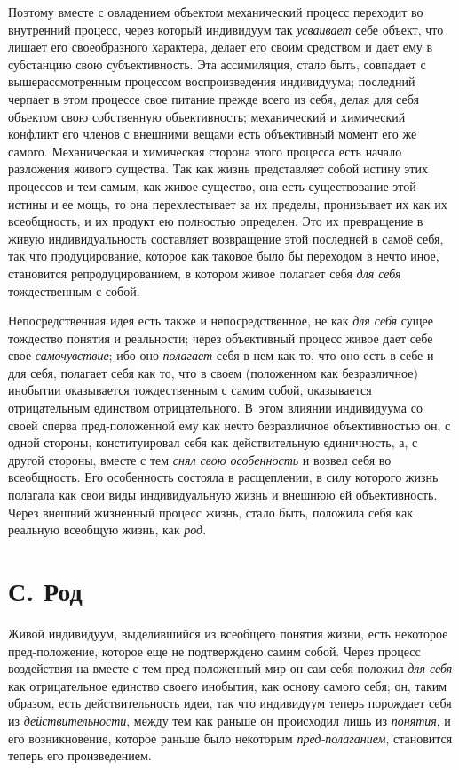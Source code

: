 Поэтому вместе с овладением объектом механический процесс
переходит во внутренний процесс, через который индивидуум так
{\em усваивает} себе
объект, что лишает его своеобразного характера, делает его своим средством
и дает ему в субстанцию свою субъективность. Эта ассимиляция, стало быть,
совпадает с вышерассмотренным процессом воспроизведения индивидуума;
последний черпает в этом процессе свое питание прежде всего из себя,
делая для себя объектом свою собственную объективность;
механический и химический конфликт его членов с внешними вещами есть
объективный момент его же самого. Механическая и химическая сторона этого
процесса есть начало разложения живого существа. Так как жизнь представляет
собой истину этих процессов и тем самым, как живое существо, она есть
существование этой истины и ее мощь, то она перехлестывает за их пределы,
пронизывает их как их всеобщность, и их продукт ею полностью определен. Это
их превращение в живую индивидуальность составляет возвращение этой
последней в самоё себя, так что продуцирование, которое как таковое было бы
переходом в нечто иное, становится репродуцированием, в котором живое
полагает себя {\em для себя}
тождественным с собой.

Непосредственная идея есть также и непосредственное, не как
{\em для себя} сущее
тождество понятия и реальности; через объективный процесс живое дает себе
свое {\em самочувствие};
ибо оно {\em полагает}
себя в нем как то, что оно есть в себе и для себя, полагает
себя как то, что в своем (положенном как безразличное) инобытии оказывается
тождественным с самим собой, оказывается отрицательным единством
отрицательного. В~этом влиянии индивидуума со своей сперва пред-положенной
ему как нечто безразличное объективностью он, с одной стороны,
конституировал себя как действительную единичность, а, с другой стороны,
вместе с тем {\em снял свою
особенность} и возвел себя во всеобщность. Его особенность
состояла в расщеплении, в силу которого жизнь полагала как свои виды
индивидуальную жизнь и внешнюю ей объективность. Через внешний жизненный
процесс жизнь, стало быть, положила себя как реальную всеобщую жизнь, как
{\em род}.

\section[С. Род]{С. Род}
Живой индивидуум, выделившийся из всеобщего понятия жизни,
есть некоторое пред-положение, которое еще не подтверждено самим собой.
Через процесс воздействия на вместе с тем пред-положенный мир он сам себя
положил {\em для себя}
как отрицательное единство своего инобытия, как основу самого
себя; он, таким образом, есть действительность идеи, так что индивидуум
теперь порождает себя из
{\em действительности},
между тем как раньше он происходил лишь из
{\em понятия}, и его
возникновение, которое раньше было некоторым
{\em пред-полаганием},
становится теперь его произведением.

